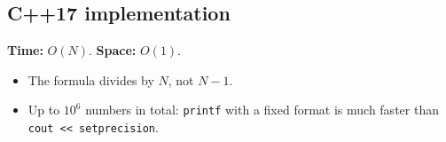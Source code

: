 \subsection*{C++17 implementation}

\begin{complexitybox}
\textbf{Time:} $O(N)$. \textbf{Space:} $O(1)$.
\end{complexitybox}

\begin{pitfallbox}
\begin{itemize}
  \item The formula divides by $N$, not $N-1$.
  \item Up to $10^6$ numbers in total: \texttt{printf} with a fixed format
        is much faster than \texttt{cout << setprecision}.
\end{itemize}
\end{pitfallbox}

